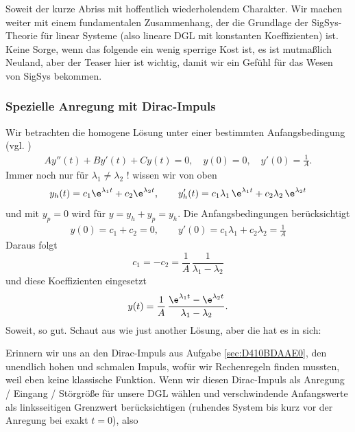 Soweit der kurze Abriss mit hoffentlich wiederholendem Charakter.
%
Wir machen weiter mit einem fundamentalen Zusammenhang, der die Grundlage der
SigSys-Theorie für linear Systeme (also lineare DGL mit konstanten Koeffizienten)
ist.
%
Keine Sorge, wenn das folgende ein wenig sperrige Kost ist, es ist mutmaßlich
Neuland, aber der Teaser hier ist wichtig, damit wir ein Gefühl für das Wesen von SigSys
bekommen.

\subsubsection{Spezielle Anregung mit Dirac-Impuls}
Wir betrachten die homogene Lösung unter einer bestimmten Anfangsbedingung
(vgl. \cite[S.97]{Strang2014})
\begin{align}
A y''(t) + B y'(t) + C y(t) = 0,\quad y(0)=0,\quad y'(0)=\frac{1}{A}.
\end{align}
%
Immer noch nur für $\lambda_1 \neq \lambda_2$ ! wissen wir von oben
\begin{align}
y_h(t) = c_1 \e^{\lambda_1 t} + c_2 \e^{\lambda_2 t},\qquad
y_h'(t) = c_1 \lambda_1 \, \e^{\lambda_1 t} + c_2 \lambda_2 \, \e^{\lambda_2 t}
\end{align}
und mit $y_p=0$ wird für $y=y_h+y_p=y_h$.
Die Anfangsbedingungen berücksichtigt
\begin{align}
y(0) = c_1 + c_2 = 0,\qquad
y'(0) = c_1 \lambda_1 + c_2 \lambda_2 = \frac{1}{A}
\end{align}
Daraus folgt
\begin{equation}
c_1 = -c_2 = \frac{1}{A} \, \frac{1}{\lambda_1 - \lambda_2}
\end{equation}
und diese Koeffizienten eingesetzt
\begin{align}
\label{sec:A7BEE9E24E_hyh}
y(t) =
\frac{1}{A} \, \frac{\e^{\lambda_1 t} - \e^{\lambda_2 t}}{\lambda_1 - \lambda_2}.
\end{align}
%
Soweit, so gut. Schaut aus wie just another Lösung, aber die hat es in sich:
%

Erinnern wir uns an den Dirac-Impuls aus Aufgabe \ref{sec:D410BDAAE0},
den unendlich hohen und schmalen Impuls,
wofür wir Rechenregeln finden mussten, weil eben keine klassische Funktion.
%
Wenn wir diesen Dirac-Impuls als Anregung / Eingang / Störgröße für unsere DGL
wählen und verschwindende Anfangswerte als linksseitigen Grenzwert
berücksichtigen (ruhendes System bis kurz vor der Anregung bei exakt $t=0$), also

